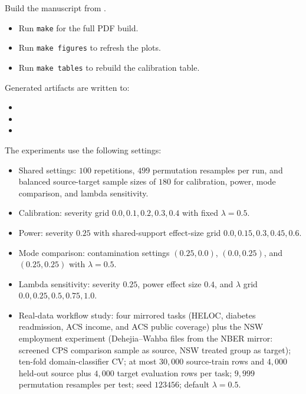 \sloppy

Build the manuscript from .

\begin{itemize}
\item Run \texttt{make} for the full PDF build.
\item Run \texttt{make figures} to refresh the plots.
\item Run \texttt{make tables} to rebuild the calibration table.
\end{itemize}

Generated artifacts are written to:

\begin{itemize}
\item {}
\item {}
\item {}
\end{itemize}

The experiments use the following settings:

\begin{itemize}
\item Shared settings: $100$ repetitions, $499$ permutation resamples per run, and balanced source-target sample sizes of $180$ for calibration, power, mode comparison, and lambda sensitivity.
\item Calibration: severity grid $0.0, 0.1, 0.2, 0.3, 0.4$ with fixed $\lambda = 0.5$.
\item Power: severity $0.25$ with shared-support effect-size grid $0.0, 0.15, 0.3, 0.45, 0.6$.
\item Mode comparison: contamination settings $(0.25, 0.0)$, $(0.0, 0.25)$, and $(0.25, 0.25)$ with $\lambda = 0.5$.
\item Lambda sensitivity: severity $0.25$, power effect size $0.4$, and $\lambda$ grid $0.0, 0.25, 0.5, 0.75, 1.0$.
\item Real-data workflow study: four mirrored tasks (HELOC, diabetes readmission, ACS income, and ACS public coverage) plus the NSW employment experiment (Dehejia--Wahba files from the NBER mirror: screened CPS comparison sample as source, NSW treated group as target); ten-fold domain-classifier CV; at most $30{,}000$ source-train rows and $4{,}000$ held-out source plus $4{,}000$ target evaluation rows per task; $9{,}999$ permutation resamples per test; seed $123456$; default $\lambda = 0.5$.
\end{itemize}

